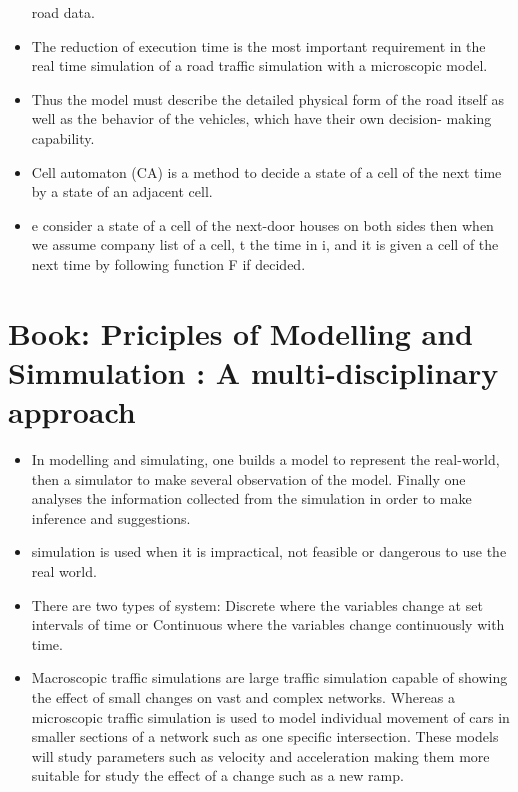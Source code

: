 \documentclass[]{article}
\begin{document}
\begin{itemize}
		 road data.
		 \item The reduction of execution time is the most
		 important requirement in the real time simulation
		 of a road traffic simulation with a microscopic
		 model.
		 \item Thus the model must describe the detailed physical
		 form of the road itself as well as the behavior of
		 the vehicles, which have their own decision-
		 making capability.
		 \item Cell automaton (CA) is a method to decide a state
		 of a cell of the next time by a state of an adjacent
		 cell.
		 \item e consider a
		 state of a cell of the next-door houses on both sides
		 then when we assume company list of a cell, t the
		 time in i, and it is given a cell of the next time by
		 following function F if decided.
		 
	\end{itemize}
	
	\section{Book: Priciples of Modelling and Simmulation : A multi-disciplinary approach}
	\begin{itemize}
		\item In modelling and simulating, one builds a model to represent the real-world, then a simulator to make several observation of the model. Finally one analyses the information collected from the simulation in order to make inference and suggestions. 
		\item simulation is used when it is impractical, not feasible or dangerous to use the real world. 
		\item There are two types of system: Discrete where the variables change at set intervals of time or Continuous where the variables change continuously with time.  
		\item Macroscopic traffic simulations are large traffic simulation capable of showing the effect of small changes on vast and complex networks. Whereas a microscopic traffic simulation is used to model individual movement of cars  in smaller sections of a network such as one specific intersection. These models will study parameters such as velocity and acceleration making them more suitable for study the effect of a change such as a new ramp. \cite{sokolowski2011principles}
	\end{itemize}
\end{document}
